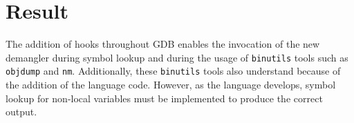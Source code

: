 \section{Result}
The addition of hooks throughout GDB enables the invocation of the new \CFAS
demangler during symbol lookup and during the usage of \verb|binutils| tools
such as \verb|objdump| and \verb|nm|. Additionally, these \verb|binutils| tools
also understand \CFAS because of the addition of the \CFAS language code.
However, as the language develops, symbol lookup for non-local variables must
be implemented to produce the correct output.
